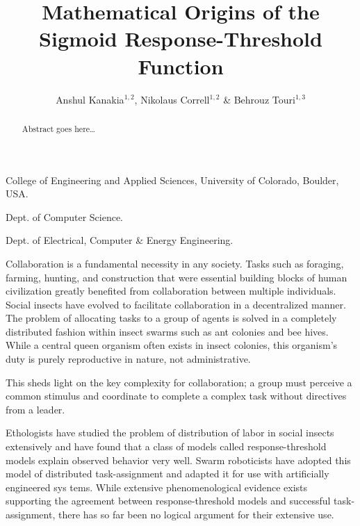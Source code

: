 \documentclass{nature}
\title{Mathematical Origins of the Sigmoid Response-Threshold Function}
\author{Anshul Kanakia$^{1,2}$, Nikolaus Correll$^{1,2}$ \& Behrouz Touri$^{1,3}$}
\begin{document}
\maketitle

\begin{affiliations}
 \item College of Engineering and Applied Sciences, University of Colorado, Boulder, USA. 
 \item Dept. of Computer Science.
 \item Dept. of Electrical, Computer \& Energy Engineering.
\end{affiliations}

\begin{abstract}
Abstract goes here\ldots
\end{abstract}

Collaboration is a fundamental necessity in any society. Tasks such as foraging, farming, hunting, and construction that were essential building blocks of human civilization greatly benefited from collaboration between multiple individuals. Social insects have evolved to facilitate collaboration in a decentralized manner. The problem of allocating tasks to a group of agents is solved in a completely distributed fashion within insect swarms such as ant colonies and bee hives. While a central queen organism often exists in insect colonies, this organism's duty is purely reproductive in nature, not administrative.

This sheds light on the key complexity for collaboration; a group must perceive a common stimulus and coordinate to complete a complex task without directives from a leader. 

Ethologists have studied the problem of distribution of labor in social insects extensively and have found that a class of models called response-threshold models explain observed behavior very well. Swarm roboticists have adopted this model of distributed task-assignment and adapted it for use with artificially engineered sys tems. While extensive phenomenological evidence exists supporting the agreement between response-threshold models and successful task-assignment, there has so far been no logical argument for their extensive use. 
\end{document}
